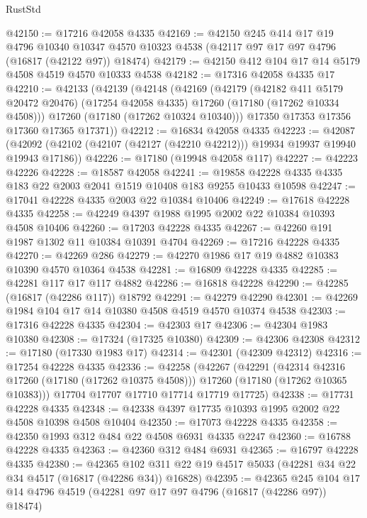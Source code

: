 \begin{lexlean}{RustStd}
\begin{coremodule}
@42150 := @17216 @42058 @4335
@42169 := @42150
    @245
    @414
    @17
    @19
    @4796
    @10340
    @10347
    @4570
    @10323
    @4538
    (@42117 @97 @17 @97 @4796 (@16817 (@42122 @97)) @18474)
@42179 := @42150 @412 @104 @17 @14 @5179 @4508 @4519 @4570 @10333 @4538
@42182 := @17316 @42058 @4335 @17
@42210 := @42133
    (@42139
      (@42148
        (@42169
          (@42179
            (@42182 @411 @5179 @20472 @20476)
            (@17254 @42058 @4335)
            @17260
            (@17180 (@17262 @10334 @4508)))
          @17260
          (@17180 (@17262 @10324 @10340)))
        @17350
        @17353
        @17356
        @17360
        @17365
        @17371))
@42212 := @16834 @42058 @4335
@42223 := @42087
    (@42092 (@42102 (@42107 (@42127 (@42210 @42212))) @19934 @19937 @19940 @19943 @17186))
@42226 := @17180 (@19948 @42058 @117)
@42227 := @42223 @42226
@42228 := @18587 @42058
@42241 := @19858 @42228 @4335 @4335 @183 @22 @2003 @2041 @1519 @10408 @183 @9255 @10433 @10598
@42247 := @17041 @42228 @4335 @2003 @22 @10384 @10406
@42249 := @17618 @42228 @4335
@42258 := @42249 @4397 @1988 @1995 @2002 @22 @10384 @10393 @4508 @10406
@42260 := @17203 @42228 @4335
@42267 := @42260 @191 @1987 @1302 @11 @10384 @10391 @4704
@42269 := @17216 @42228 @4335
@42270 := @42269 @286
@42279 := @42270 @1986 @17 @19 @4882 @10383 @10390 @4570 @10364 @4538
@42281 := @16809 @42228 @4335
@42285 := @42281 @117 @17 @117 @4882
@42286 := @16818 @42228
@42290 := @42285 (@16817 (@42286 @117)) @18792
@42291 := @42279 @42290
@42301 := @42269 @1984 @104 @17 @14 @10380 @4508 @4519 @4570 @10374 @4538
@42303 := @17316 @42228 @4335
@42304 := @42303 @17
@42306 := @42304 @1983 @10380
@42308 := @17324 (@17325 @10380)
@42309 := @42306 @42308
@42312 := @17180 (@17330 @1983 @17)
@42314 := @42301 (@42309 @42312)
@42316 := @17254 @42228 @4335
@42336 := @42258
    (@42267
      (@42291
        (@42314 @42316 @17260 (@17180 (@17262 @10375 @4508)))
        @17260
        (@17180 (@17262 @10365 @10383)))
      @17704
      @17707
      @17710
      @17714
      @17719
      @17725)
@42338 := @17731 @42228 @4335
@42348 := @42338 @4397 @17735 @10393 @1995 @2002 @22 @4508 @10398 @4508 @10404
@42350 := @17073 @42228 @4335
@42358 := @42350 @1993 @312 @484 @22 @4508 @6931 @4335 @2247
@42360 := @16788 @42228 @4335
@42363 := @42360 @312 @484 @6931
@42365 := @16797 @42228 @4335
@42380 := @42365
    @102
    @311
    @22
    @19
    @4517
    @5033
    (@42281 @34 @22 @34 @4517 (@16817 (@42286 @34)) @16828)
@42395 := @42365
    @245
    @104
    @17
    @14
    @4796
    @4519
    (@42281 @97 @17 @97 @4796 (@16817 (@42286 @97)) @18474)

\end{coremodule}
\end{lexlean}
